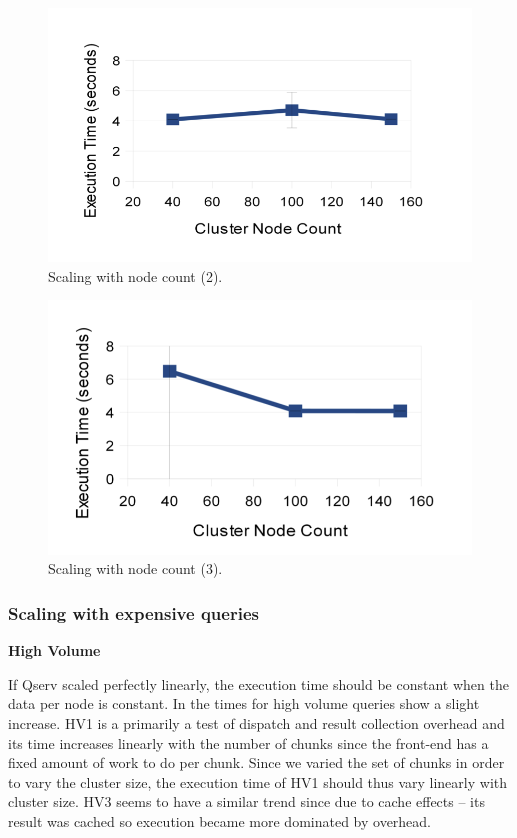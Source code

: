 \documentclass[DM,toc]{lsstdoc}
\begin{document}
\begin{figure}[H]
\centering
\includegraphics{_static/150_node_scaling_small_2}
\caption{Scaling with node count (2).}
\label{fig:150-node-scaling-small-2}
\end{figure}

\begin{figure}[H]
\centering
\includegraphics{_static/150_node_scaling_small_3}
\caption{Scaling with node count (3).}
\label{fig:150-node-scaling-small-3}
\end{figure}

\subsubsection{Scaling with expensive
queries}\label{scaling-with-expensive-queries}

\textbf{High Volume}

If Qserv scaled perfectly linearly, the execution time should be
constant when the data per node is constant. In
 the times for high volume queries show
a slight increase. HV1 is a primarily a test of dispatch and result
collection overhead and its time increases linearly with the number of
chunks since the front-end has a fixed amount of work to do per chunk.
Since we varied the set of chunks in order to vary the cluster size, the
execution time of HV1 should thus vary linearly with cluster size. HV3
seems to have a similar trend since due to cache effects -- its result
was cached so execution became more dominated by overhead.
\end{document}
